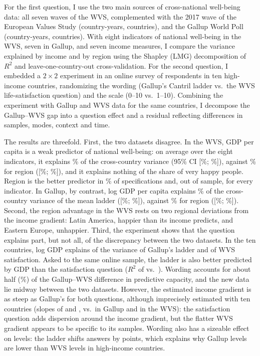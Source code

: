\documentclass[12pt]{article}
\begin{document}
For the first question, I use the two main sources of cross-national well-being data: all seven waves of the WVS, complemented with the 2017 wave of the European Values Study (\nWVSCountryYears country-years, \nWVSCountries countries), and the Gallup World Poll (\nGallupCountryYears country-years, \nGallupCountries countries). With eight indicators of national well-being in the WVS, seven in Gallup, and seven income measures, I compare the variance explained by income and by region using the Shapley (LMG) decomposition of $R^2$ \citep{lindeman_introduction_1980,gromping_estimators_2007} and leave-one-country-out cross-validation.
For the second question, I embedded a $2 \times 2$ experiment in an online survey of \nFabre respondents in ten high-income countries, randomizing the wording (Gallup's Cantril ladder vs.\ the WVS life-satisfaction question) and the scale (0--10 vs.\ 1--10). Combining the experiment with Gallup and WVS data for the same countries, I decompose the Gallup--WVS gap into a question effect and a residual reflecting differences in samples, modes, context and time.

The results are threefold. First, the two datasets disagree. In the WVS, GDP per capita is a weak predictor of national well-being: on average over the eight indicators, it explains \meanRtwoIncomePPP\% of the cross-country variance (95\% CI [\ciLowWVSMeanRIncome\%; \ciHighWVSMeanRIncome\%]), against \meanRtwoRegion\% for region ([\ciLowWVSMeanRRegion\%; \ciHighWVSMeanRRegion\%]), and it explains nothing of the share of very happy people. Region is the better predictor in \shareRegionBetterWVS\% of specifications and, out of sample, for every indicator. In Gallup, by contrast, log GDP per capita explains \RtwoGallupMeanPPP\% of the cross-country variance of the mean ladder ([\ciLowGallupRIncome\%; \ciHighGallupRIncome\%]), against \RtwoGallupRegion\% for region ([\ciLowGallupRRegion\%; \ciHighGallupRRegion\%]). Second, the region advantage in the WVS rests on two regional deviations from the income gradient: Latin America, happier than its income predicts, and Eastern Europe, unhappier. Third, the experiment shows that the question explains part, but not all, of the discrepancy between the two datasets. In the ten countries, log GDP explains \RtwoTenGallup of the variance of Gallup's ladder and \RtwoTenWVS of WVS satisfaction. Asked to the same online sample, the ladder is also better predicted by GDP than the satisfaction question ($R^2$ of \RtwoTenFabreLadderPooled vs.\ \RtwoTenFabreSatisfactionPooled). Wording accounts for about half (\decompShareRWordingPooledPct\%) of the Gallup--WVS difference in predictive capacity, and the new data lie midway between the two datasets. However, the estimated income gradient is as steep as Gallup's for both questions, although imprecisely estimated with ten countries (slopes of \slopeTenFabreLadderPooled and \slopeTenFabreSatisfactionPooled, vs.\ \slopeTenGallup in Gallup and \slopeTenWVS in the WVS): the satisfaction question adds dispersion around the income gradient, but the flatter WVS gradient appears to be specific to its samples. Wording also has a sizeable effect on levels: the ladder shifts answers by \effectLadder points, which explains why Gallup levels are lower than WVS levels in high-income countries.
\end{document}
